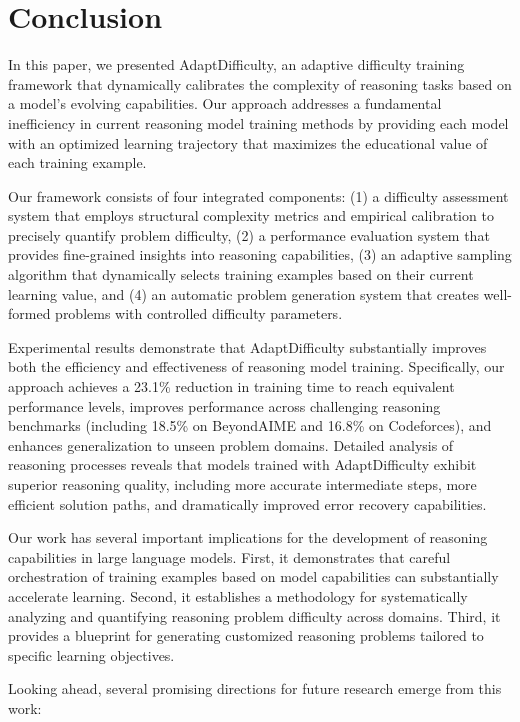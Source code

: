 \section{Conclusion}

In this paper, we presented AdaptDifficulty, an adaptive difficulty training framework that dynamically calibrates the complexity of reasoning tasks based on a model's evolving capabilities. Our approach addresses a fundamental inefficiency in current reasoning model training methods by providing each model with an optimized learning trajectory that maximizes the educational value of each training example.

Our framework consists of four integrated components: (1) a difficulty assessment system that employs structural complexity metrics and empirical calibration to precisely quantify problem difficulty, (2) a performance evaluation system that provides fine-grained insights into reasoning capabilities, (3) an adaptive sampling algorithm that dynamically selects training examples based on their current learning value, and (4) an automatic problem generation system that creates well-formed problems with controlled difficulty parameters.

Experimental results demonstrate that AdaptDifficulty substantially improves both the efficiency and effectiveness of reasoning model training. Specifically, our approach achieves a 23.1\% reduction in training time to reach equivalent performance levels, improves performance across challenging reasoning benchmarks (including 18.5\% on BeyondAIME and 16.8\% on Codeforces), and enhances generalization to unseen problem domains. Detailed analysis of reasoning processes reveals that models trained with AdaptDifficulty exhibit superior reasoning quality, including more accurate intermediate steps, more efficient solution paths, and dramatically improved error recovery capabilities.

Our work has several important implications for the development of reasoning capabilities in large language models. First, it demonstrates that careful orchestration of training examples based on model capabilities can substantially accelerate learning. Second, it establishes a methodology for systematically analyzing and quantifying reasoning problem difficulty across domains. Third, it provides a blueprint for generating customized reasoning problems tailored to specific learning objectives.

Looking ahead, several promising directions for future research emerge from this work:

